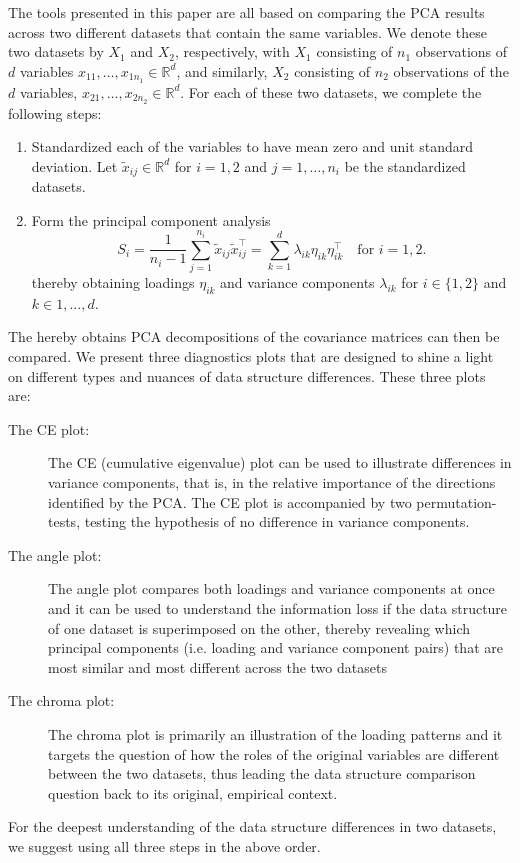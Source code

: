 \documentclass[titlepage,11pt,twoside]{article}
\newcommand{\RR}{\mathbb{R}}
\begin{document}
The tools presented in this paper are all based on comparing the PCA results across two different datasets that contain the same variables. We denote these two datasets by $X_1$ and $X_2$, respectively, with $X_1$ consisting of $n_1$ observations of $d$ variables $x_{11},\dotsc,x_{1 n_1} \in \RR^d$, and similarly, $X_2$ consisting of $n_2$ observations of the $d$ variables, $x_{21},\dotsc,x_{2 n_2} \in \RR^d$. For each of these two datasets, we complete the following steps:
\begin{enumerate}
\item Standardized each of the variables to have mean zero and unit standard deviation. Let $\tilde{x}_{ij} \in \RR^d$ for $i=1,2$ and $j=1,\dotsc,n_i$ be the standardized datasets. 
\item Form the principal component analysis
\begin{equation*}
S_i = \frac{1}{n_i-1} \sum_{j=1}^{n_i} \tilde{x}_{ij} \tilde{x}_{ij}^\top = \sum_{k=1}^d \lambda_{ik} \eta_{ik} \eta_{ik}^\top \quad \text{for $i=1,2$.}
\end{equation*}
thereby obtaining loadings $\eta_{ik}$ and variance components $\lambda_{ik}$ for $i \in \{1, 2\}$ and $k \in 1, ..., d$.
\end{enumerate}
The hereby obtains PCA decompositions of the covariance matrices can then be compared. We present three diagnostics plots that are designed to shine a light on different types and nuances of data structure differences. These three plots are:
\begin{description}
\item[The CE plot:] The CE (cumulative eigenvalue) plot can be used to illustrate differences in variance components, that is, in the relative importance of the directions identified by the PCA. The CE plot is accompanied by two permutation-tests, testing the hypothesis of no difference in variance components.
\item[The angle plot:] The angle plot compares both loadings and variance components at once and it can be used to understand the information loss if the data structure of one dataset is superimposed on the other, thereby revealing which principal components (i.e. loading and variance component pairs) that are most similar and most different across the two datasets
\item[The chroma plot:] The chroma plot is primarily an illustration of the loading patterns and it targets the question of how the roles of the original variables are different between the two datasets, thus leading the data structure comparison question back to its original, empirical context.
\end{description}
For the deepest understanding of the data structure differences in two datasets, we suggest using all three steps in the above order. 
\end{document}
